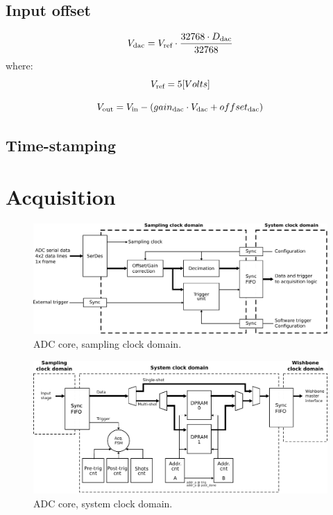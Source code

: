 \documentclass[11pt,a4paper]{article}
\newcommand{\subscript}[1]{\ensuremath{_{\textnormal{\scriptsize{#1}}}}}
\begin{document}
\subsection{Input offset}

\begin{equation}\label{dac_digital2volts}
V\subscript{dac} = V\subscript{ref} \cdot \frac{32768 \cdot D\subscript{dac}}{32768} \\
\end{equation}
where:
\begin{equation}
V\subscript{ref} = 5 [Volts]
\end{equation}


\begin{equation}\label{in_dac_offset}
V\subscript{out} = V\subscript{in} - (gain\subscript{dac} \cdot V\subscript{dac} + offset\subscript{dac})
\end{equation}


\subsection{Time-stamping}



\section{Acquisition}

\begin{figure}[h!]
  \includegraphics[width=\textwidth]{figures/adc_core_fs_clk.pdf}
  \caption{ADC core, sampling clock domain.}
  \label{fig:adc_core_fs_clk}
\end{figure}

\begin{figure}[h!]
  \includegraphics[width=\textwidth]{figures/adc_core_sys_clk.pdf}
  \caption{ADC core, system clock domain.}
  \label{fig:adc_core_sys_clk}
\end{figure}
\end{document}
